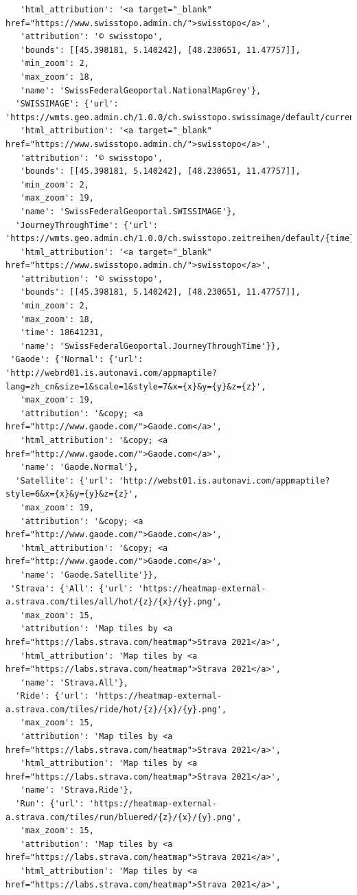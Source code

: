 \documentclass[
  letterpaper,
  DIV=11,
  numbers=noendperiod]{scrreprt}
\begin{document}
\begin{verbatim}
   'html_attribution': '<a target="_blank" href="https://www.swisstopo.admin.ch/">swisstopo</a>',
   'attribution': '© swisstopo',
   'bounds': [[45.398181, 5.140242], [48.230651, 11.47757]],
   'min_zoom': 2,
   'max_zoom': 18,
   'name': 'SwissFederalGeoportal.NationalMapGrey'},
  'SWISSIMAGE': {'url': 'https://wmts.geo.admin.ch/1.0.0/ch.swisstopo.swissimage/default/current/3857/{z}/{x}/{y}.jpeg',
   'html_attribution': '<a target="_blank" href="https://www.swisstopo.admin.ch/">swisstopo</a>',
   'attribution': '© swisstopo',
   'bounds': [[45.398181, 5.140242], [48.230651, 11.47757]],
   'min_zoom': 2,
   'max_zoom': 19,
   'name': 'SwissFederalGeoportal.SWISSIMAGE'},
  'JourneyThroughTime': {'url': 'https://wmts.geo.admin.ch/1.0.0/ch.swisstopo.zeitreihen/default/{time}/3857/{z}/{x}/{y}.png',
   'html_attribution': '<a target="_blank" href="https://www.swisstopo.admin.ch/">swisstopo</a>',
   'attribution': '© swisstopo',
   'bounds': [[45.398181, 5.140242], [48.230651, 11.47757]],
   'min_zoom': 2,
   'max_zoom': 18,
   'time': 18641231,
   'name': 'SwissFederalGeoportal.JourneyThroughTime'}},
 'Gaode': {'Normal': {'url': 'http://webrd01.is.autonavi.com/appmaptile?lang=zh_cn&size=1&scale=1&style=7&x={x}&y={y}&z={z}',
   'max_zoom': 19,
   'attribution': '&copy; <a href="http://www.gaode.com/">Gaode.com</a>',
   'html_attribution': '&copy; <a href="http://www.gaode.com/">Gaode.com</a>',
   'name': 'Gaode.Normal'},
  'Satellite': {'url': 'http://webst01.is.autonavi.com/appmaptile?style=6&x={x}&y={y}&z={z}',
   'max_zoom': 19,
   'attribution': '&copy; <a href="http://www.gaode.com/">Gaode.com</a>',
   'html_attribution': '&copy; <a href="http://www.gaode.com/">Gaode.com</a>',
   'name': 'Gaode.Satellite'}},
 'Strava': {'All': {'url': 'https://heatmap-external-a.strava.com/tiles/all/hot/{z}/{x}/{y}.png',
   'max_zoom': 15,
   'attribution': 'Map tiles by <a href="https://labs.strava.com/heatmap">Strava 2021</a>',
   'html_attribution': 'Map tiles by <a href="https://labs.strava.com/heatmap">Strava 2021</a>',
   'name': 'Strava.All'},
  'Ride': {'url': 'https://heatmap-external-a.strava.com/tiles/ride/hot/{z}/{x}/{y}.png',
   'max_zoom': 15,
   'attribution': 'Map tiles by <a href="https://labs.strava.com/heatmap">Strava 2021</a>',
   'html_attribution': 'Map tiles by <a href="https://labs.strava.com/heatmap">Strava 2021</a>',
   'name': 'Strava.Ride'},
  'Run': {'url': 'https://heatmap-external-a.strava.com/tiles/run/bluered/{z}/{x}/{y}.png',
   'max_zoom': 15,
   'attribution': 'Map tiles by <a href="https://labs.strava.com/heatmap">Strava 2021</a>',
   'html_attribution': 'Map tiles by <a href="https://labs.strava.com/heatmap">Strava 2021</a>',

\end{verbatim}
\end{document}

